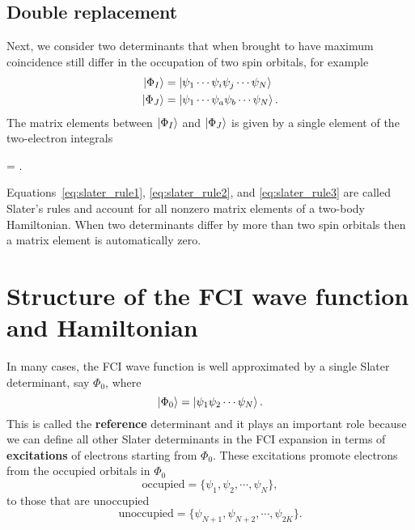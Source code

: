 \documentclass[../Main/chem532-notes.tex]{subfiles}
\begin{document}
\subsection{Double replacement}
Next, we consider two determinants that when brought to have maximum coincidence still differ in the occupation of two spin orbitals, for example
\begin{align}
\ket{\Phi_I} & = \ket{\psi_1 \cdots \psi_i \psi_j \cdots \psi_N} \\
\ket{\Phi_J} & = \ket{\psi_1 \cdots \psi_a \psi_b \cdots \psi_N}.
\end{align}
The matrix elements between $\ket{\Phi_I}$ and $\ket{\Phi_J}$ is given by a single element of the two-electron integrals
\begin{iequation}
\label{eq:slater_rule3}
   = .
\end{iequation}
Equations~\eqref{eq:slater_rule1}, \eqref{eq:slater_rule2}, and \eqref{eq:slater_rule3} are called Slater's rules and account for all nonzero matrix elements of a two-body Hamiltonian.
When two determinants differ by more than two spin orbitals then a matrix element is automatically zero.

\section{Structure of the FCI wave function and Hamiltonian}
In many cases, the FCI wave function is well approximated by a single Slater determinant, say $\Phi_0$, where 
\begin{equation}
\ket{\Phi_0} = \ket{\psi_1 \psi_2 \cdots \psi_N}.
\end{equation}
This is called the \textbf{reference} determinant and it plays an important role because we can define all other Slater determinants in the FCI expansion in terms of \textbf{excitations} of electrons starting from $\Phi_0$.
These excitations promote electrons from the occupied orbitals in $\Phi_0$
\begin{equation}
\text{occupied} = \{\psi_1, \psi_2, \cdots, \psi_N\},
\end{equation}
to those that are unoccupied
\begin{equation}
\text{unoccupied} =  \{\psi_{N+1}, \psi_{N+2}, \cdots, \psi_{2K}\}.
\end{equation}
\end{document}

